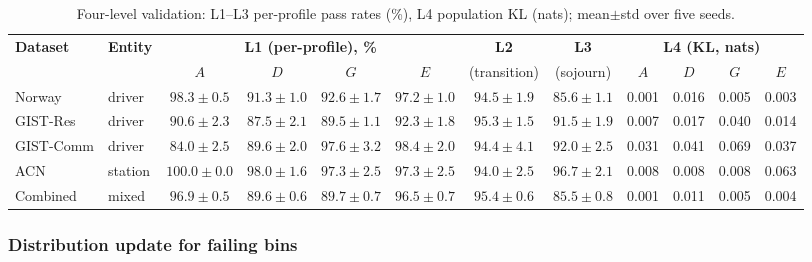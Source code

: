 \documentclass[journal]{IEEEtran}
\begin{document}
\begin{table}[t]
\centering
\caption{Four-level validation: L1--L3 per-profile pass rates (\%), L4 population KL (nats); mean$\pm$std over five seeds.}
\label{tab:validation}
\setlength{\tabcolsep}{4pt}
\footnotesize
\begin{tabular}{ll cccc cc cccc}
\toprule
\multirow{2}{*}{\textbf{Dataset}} & \multirow{2}{*}{\textbf{Entity}} & \multicolumn{4}{c}{\textbf{L1 (per-profile), \%}} & \textbf{L2} & \textbf{L3} & \multicolumn{4}{c}{\textbf{L4 (KL, nats)}} \\
\cmidrule(lr){3-6}\cmidrule(lr){9-12}
 & & $A$ & $D$ & $G$ & $E$ & {\footnotesize(transition)} & {\footnotesize(sojourn)} & $A$ & $D$ & $G$ & $E$ \\
\midrule
Norway & driver & $98.3\pm0.5$ & $91.3\pm1.0$ & $92.6\pm1.7$ & $97.2\pm1.0$ & $94.5\pm1.9$ & $85.6\pm1.1$ & 0.001 & 0.016 & 0.005 & 0.003 \\
GIST-Res & driver & $90.6\pm2.3$ & $87.5\pm2.1$ & $89.5\pm1.1$ & $92.3\pm1.8$ & $95.3\pm1.5$ & $91.5\pm1.9$ & 0.007 & 0.017 & 0.040 & 0.014 \\
GIST-Comm & driver & $84.0\pm2.5$ & $89.6\pm2.0$ & $97.6\pm3.2$ & $98.4\pm2.0$ & $94.4\pm4.1$ & $92.0\pm2.5$ & 0.031 & 0.041 & 0.069 & 0.037 \\
ACN & station & $100.0\pm0.0$ & $98.0\pm1.6$ & $97.3\pm2.5$ & $97.3\pm2.5$ & $94.0\pm2.5$ & $96.7\pm2.1$ & 0.008 & 0.008 & 0.008 & 0.063 \\
\midrule
Combined & mixed & $96.9\pm0.5$ & $89.6\pm0.6$ & $89.7\pm0.7$ & $96.5\pm0.7$ & $95.4\pm0.6$ & $85.5\pm0.8$ & 0.001 & 0.011 & 0.005 & 0.004 \\
\bottomrule
\end{tabular}
\end{table}

\subsubsection{Distribution update for failing bins}
\end{document}
